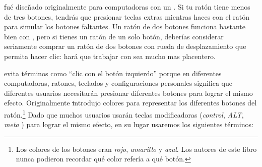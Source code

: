 \documentclass[a4paper,10pt,twoside]{book}
\begin{document}
\st fu\'e dise\~nado originalmente para computadoras con un . Si tu rat\'on tiene menos de tres botones, tendr\'as que presionar teclas extras mientras haces \click con el rat\'on para simular los botones faltantes. Un rat\'on de dos botones funciona bastante bien con \pharo, pero si tienes un rat\'on de un solo bot\'on, deber\'ias considerar seriamente comprar un rat\'on de dos botones con rueda de desplazamiento que permita hacer clic: har\'a que trabajar con \pharo sea mucho mas placentero.

\pharo evita t\'erminos como ``clic con el bot\'on izquierdo'' porque en diferentes computadoras, ratones, teclados y configuraciones personales significa que diferentes usuarios necesitar\'an presionar diferentes botones para lograr el mismo efecto.
Originalmente \st introdujo colores para representar los diferentes botones del rat\'on.\footnote{Los colores de los botones eran \emph{rojo}, \emph{amarillo} y \emph{azul}. Los autores de este libro nunca podieron recordar qu\'e color refer\'ia a qu\'e bot\'on.}
Dado que muchos usuarios usar\'an teclas modificadoras (\emph{control}, \emph{ALT}, \emph{meta} \etc) para lograr el mismo efecto, en su lugar usaremos los siguientes t\'erminos:
\end{document}

